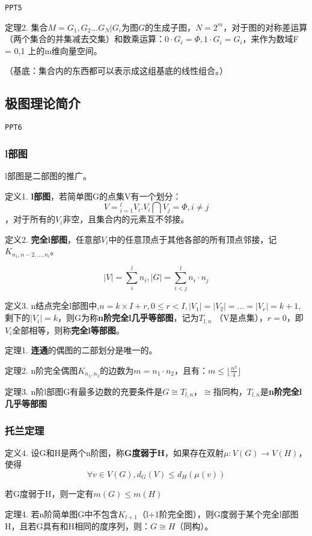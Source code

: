 \documentclass{article}
\begin{document}
\texttt{PPT5}

定理2. 集合$M = {G_1,G_2...G_N | G_i为图G的生成子图，N = 2^m}$，对于图的对称差运算（两个集合的并集减去交集）和数乘运算：$0 \cdot G_i = \Phi , 1 \cdot G_i = G_i$，来作为数域F = {0,1} 上的m维向量空间。

（基底：集合内的东西都可以表示成这组基底的线性组合。）

\subsection{极图理论简介}

\texttt{PPT6}

\subsubsection{l部图}

l部图是二部图的推广。

定义1. \textbf{l部图}，若简单图G的点集V有一个划分： $$ V = {_{i=1}^l V_i. V_i \bigcap V_j = \Phi, i \ne j }$$，对于所有的$V_i$非空，且集合内的元素互不邻接。

定义2. \textbf{完全l部图}，任意部$V_i$中的任意顶点于其他各部的所有顶点邻接，记$K_{n_1,n-2,...,n_l}$。

$$|V| = \sum_i^l n_i, |G| = \sum_{i < j}^l n_i\cdot n_j$$

定义3. n结点完全l部图中,$n = k \times I + r, 0 \le r < I, |V_1| = |V_2| = ... = |V_r| = k + 1$, 剩下的$|V_i| = k$，则G为称\textbf{n阶完全l几乎等部图}，记为$T_{l,n}$ （V是点集），$r = 0$，即$V_i$全部相等，则称\textbf{完全l等部图}。

定理1. \textbf{连通}的偶图的二部划分是唯一的。

定理2. n阶完全偶图$K_{n_1,n_2}$的边数为$m = n_1 \cdot n_2$，且有：$m \le \lfloor \frac{n^2}{4} \rfloor $

定理3. n阶l部图G有最多边数的充要条件是$G \cong T_{l,n}$，$\cong$指同构，$T_{l,n}$是\textbf{n阶完全l几乎等部图}

\subsubsection{托兰定理}

定义4. 设G和H是两个n阶图，称\textbf{G度弱于H}，如果存在双射$\mu :V(G) \to V(H)$，使得$$\forall v \in V(G), d_G(V) \le d_H(\mu(v))$$

若G度弱于H，则一定有$m(G) \le m(H)$

定理4. 若n阶简单图G中不包含$K_{l+1}$（l+1阶完全图），则G度弱于某个完全l部图H，且若G具有和H相同的度序列，则：$G \cong H$（同构）。
\end{document}
